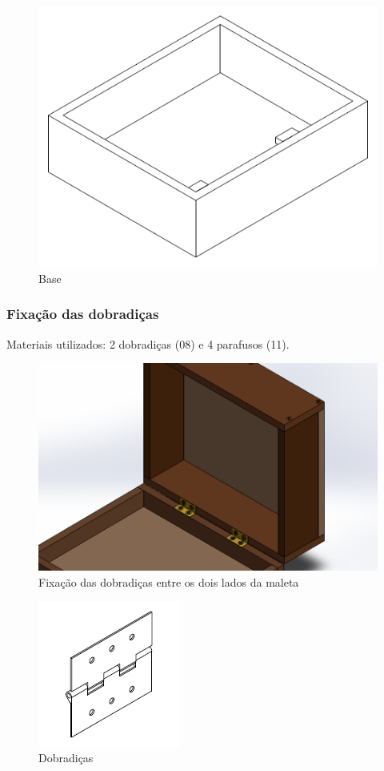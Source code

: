 \begin{figure} [H]
    \centering
    \includegraphics[width=.5\textwidth]{Figuras/gcs/base.png}
    \caption{Base}
    \label{fig:base}
\end{figure}

\subsubsection{Fixação das dobradiças}

Materiais utilizados: 2 dobradiças (08) e 4 parafusos (11).

\begin{figure} [H]
    \centering
    \includegraphics[width=.7\textwidth]{Figuras/montagemMaletasEstrutura/controleDobradicas.png}
    \caption{Fixação das dobradiças entre os dois lados da maleta}
    \label{fig:controleDobradicas}
\end{figure}

\begin{figure} [H]
    \centering
    \includegraphics[width=.3\textwidth]{Figuras/gcs/dobradica.png}
    \caption{Dobradiças}
    \label{fig:dobradicas}
\end{figure}

